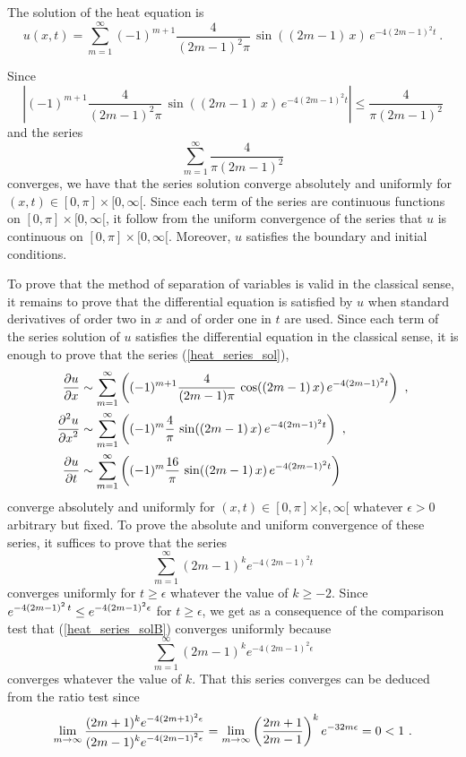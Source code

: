 \begin{egg}
The solution of the heat equation is
\begin{equation} \label{heat_series_sol}
u(x,t) = \sum_{m=1}^\infty (-1)^{m+1}\frac{4}{(2m-1)^2 \pi}\,
\sin((2m-1)\,x)\, e^{-4(2m-1)^2t} \ .
\end{equation}

Since
\[
\left| (-1)^{m+1}\frac{4}{(2m-1)^2 \pi}\, \sin((2m-1)\,x)\, e^{-4(2m-1)^2t}
\right| \leq \frac{4}{\pi(2m-1)^2}
\]
and the series
\[
\sum_{m=1}^\infty \frac{4}{\pi(2m-1)^2}
\]
converges, we have that the series solution converge absolutely and
uniformly for $(x,t) \in [0,\pi] \times [0,\infty[$.  Since each term
of the series are continuous functions on $[0,\pi] \times [0,\infty[$,
it follow from the uniform convergence of the series that $u$ is
continuous on $[0,\pi] \times [0,\infty[$.  Moreover, $u$
satisfies the boundary and initial conditions.

To prove that the method of separation of variables is valid in the
classical sense, it remains to prove that the differential equation is
satisfied by $u$ when standard derivatives of order two in $x$ and of
order one in $t$ are used.  Since each term of the series solution of
$u$ satisfies the differential equation in the classical sense, it is
enough to prove that the series (\ref{heat_series_sol}),
\begin{equation} \label{heat_spv_der_series}
\begin{split}
\frac{\partial{u}}{\partial x} &\sim \sum_{m=1}^\infty  \left( (-1)^{m+1}\frac{4}{(2m-1) \pi}\,
\cos((2m-1)\,x)\, e^{-4(2m-1)^2t} \right) \ , \\
\frac{\displaystyle \partial^{2}{u}} {\displaystyle \partial x^{2}} &\sim \sum_{m=1}^\infty \left( (-1)^m\frac{4}{\pi}\,
\sin((2m-1)\,x)\, e^{-4(2m-1)^2t} \right) \ , \\
\frac{\partial{u}}{\partial t} &\sim \sum_{m=1}^\infty \left( (-1)^m\frac{16}{\pi}\,
\sin((2m-1)\,x)\, e^{-4(2m-1)^2t} \right)
\end{split}
\end{equation}
converge absolutely and uniformly for
$(x,t)\in [0,\pi]\times ]\epsilon,\infty[$
whatever $\epsilon>0$ arbitrary but fixed.  To prove the absolute and uniform
convergence of these series, it suffices to prove that the series
\begin{equation}\label{heat_series_solB}
\sum_{m=1}^\infty (2m-1)^{k} e^{-4(2m-1)^2 t}
\end{equation}
converges uniformly for $t\geq \epsilon$ whatever the value of
$k\geq -2$.  Since
$\displaystyle e^{-4(2m-1)^2\,t} \leq e^{-4(2m-1)^2\epsilon}$
for $t\geq \epsilon$, we get as a consequence of the comparison test that
(\ref{heat_series_solB}) converges uniformly because
\[
\sum_{m=1}^\infty (2m-1)^{k} e^{-4(2m-1)^2\epsilon}
\]
converges whatever the value of $k$.  That this series converges can
be deduced from the ratio test since
\[
\lim_{m\rightarrow \infty}
\frac{ \displaystyle (2m+1)^{k} e^{-4(2m+1)^2\epsilon}}
{ \displaystyle (2m-1)^{k} e^{-4(2m-1)^2\epsilon}}
= \lim_{m\rightarrow \infty} \left(\frac{2m+1}{2m-1}\right)^{k}
e^{-32 m \epsilon} = 0 < 1 \  .
\]
\end{egg}

